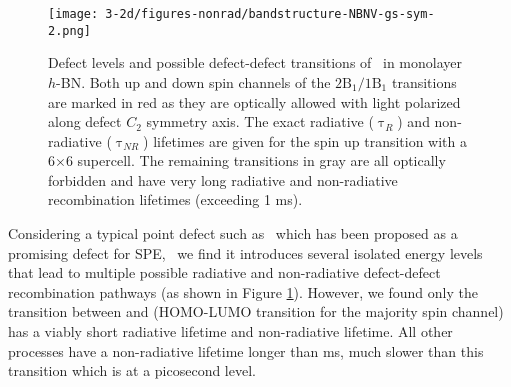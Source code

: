 \begin{figure}%
    \centering
  \texttt{[image: 3-2d/figures-nonrad/bandstructure-NBNV-gs-sym-2.png]}
  \caption{Defect levels and possible defect-defect transitions of \NBVN\ in monolayer $h$-BN. Both up and down spin channels of the $\mathrm{2B_1}/\mathrm{1B_1}$ transitions are marked in red as they are optically allowed with light polarized along defect $C_{2}$ symmetry axis. The exact radiative  ($\uptau_R$) and non-radiative ($\uptau_{NR}$) lifetimes are given for the spin up transition with a 6$\times$6 supercell. The remaining transitions in gray are all  optically forbidden and have very long radiative and non-radiative recombination lifetimes (exceeding 1 ms).
  }
  \label{fig:NBVN-compare-R-NR-all}
\end{figure}


Considering a typical point defect such as \NBVN\, which has been proposed as a promising defect for SPE,~\cite{exarhos2019magnetic,tran2016quantum,abdi2018color}
we find it introduces several isolated energy levels that lead to multiple possible radiative and non-radiative defect-defect recombination pathways (as shown in Figure \ref{fig:NBVN-compare-R-NR-all}). However, we found only
the transition between  and  (HOMO-LUMO transition for the majority spin channel)
has a viably short radiative lifetime and non-radiative lifetime. All other processes have a non-radiative lifetime longer than ms, much slower than this transition which is at a picosecond level.


